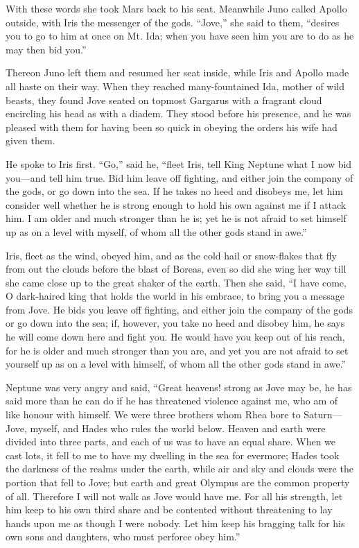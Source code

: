 With these words she took Mars back to his seat. Meanwhile Juno called
Apollo outside, with Iris the messenger of the gods. “Jove,” she said to
them, “desires you to go to him at once on Mt. Ida; when you have seen him
you are to do as he may then bid you.”

Thereon Juno left them and resumed her seat inside, while Iris and Apollo
made all haste on their way. When they reached many-fountained Ida, mother
of wild beasts, they found Jove seated on topmost Gargarus with a fragrant
cloud encircling his head as with a diadem. They stood before his
presence, and he was pleased with them for having been so quick in obeying
the orders his wife had given them.

He spoke to Iris first. “Go,” said he, “fleet Iris, tell King Neptune what
I now bid you—and tell him true. Bid him leave off fighting, and
either join the company of the gods, or go down into the sea. If he takes
no heed and disobeys me, let him consider well whether he is strong enough
to hold his own against me if I attack him. I am older and much stronger
than he is; yet he is not afraid to set himself up as on a level with
myself, of whom all the other gods stand in awe.”

Iris, fleet as the wind, obeyed him, and as the cold hail or snow-flakes
that fly from out the clouds before the blast of Boreas, even so did she
wing her way till she came close up to the great shaker of the earth. Then
she said, “I have come, O dark-haired king that holds the world in his
embrace, to bring you a message from Jove. He bids you leave off fighting,
and either join the company of the gods or go down into the sea; if,
however, you take no heed and disobey him, he says he will come down here
and fight you. He would have you keep out of his reach, for he is older
and much stronger than you are, and yet you are not afraid to set yourself
up as on a level with himself, of whom all the other gods stand in awe.”

Neptune was very angry and said, “Great heavens! strong as Jove may be, he
has said more than he can do if he has threatened violence against me, who
am of like honour with himself. We were three brothers whom Rhea bore to
Saturn—Jove, myself, and Hades who rules the world below. Heaven and
earth were divided into three parts, and each of us was to have an equal
share. When we cast lots, it fell to me to have my dwelling in the sea for
evermore; Hades took the darkness of the realms under the earth, while air
and sky and clouds were the portion that fell to Jove; but earth and great
Olympus are the common property of all. Therefore I will not walk as Jove
would have me. For all his strength, let him keep to his own third share
and be contented without threatening to lay hands upon me as though I were
nobody. Let him keep his bragging talk for his own sons and daughters, who
must perforce obey him.”

